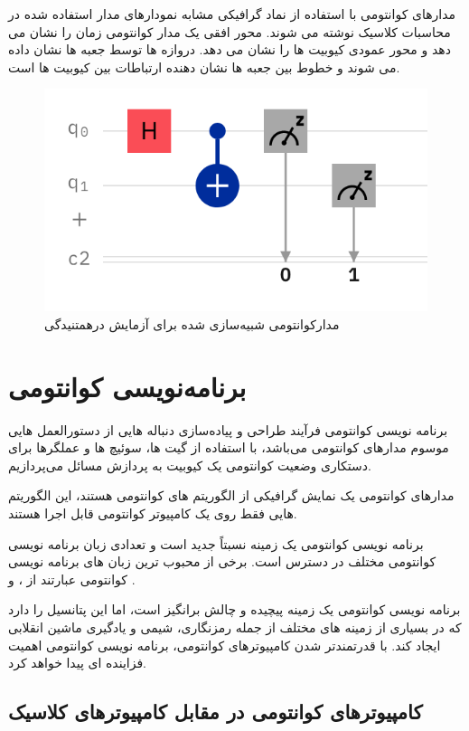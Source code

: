 \documentclass{book}
\begin{document}
مدارهای کوانتومی با استفاده از نماد گرافیکی مشابه نمودارهای مدار استفاده شده در محاسبات کلاسیک نوشته می شوند. محور افقی یک مدار کوانتومی زمان را نشان می دهد و محور عمودی کیوبیت ها را نشان می دهد. دروازه ها توسط جعبه ها نشان داده می شوند و خطوط بین جعبه ها نشان دهنده ارتباطات بین کیوبیت ها است.

\begin{figure}[ht]
	\centering
	\includegraphics[]{meas-firstcirc.png}
	\caption{مدارکوانتومی شبیه‌سازی شده برای آزمایش درهمتنیدگی}
\end{figure}

\chapter{برنامه‌نویسی کوانتومی}
برنامه نویسی کوانتومی فرآیند طراحی و پیاده‌سازی دنباله هایی از دستورالعمل هایی موسوم مدارهای کوانتومی می‌باشد، با استفاده از گیت ها، سوئیچ ها و عملگرها برای دستکاری وضعیت کوانتومی یک کیوبیت به پردازش مسائل می‌پردازیم.

مدارهای کوانتومی یک نمایش گرافیکی از الگوریتم های کوانتومی هستند، این الگوریتم هایی فقط روی یک کامپیوتر کوانتومی قابل اجرا هستند.

برنامه نویسی کوانتومی یک زمینه نسبتاً جدید است و تعدادی زبان برنامه نویسی کوانتومی مختلف در دسترس است. برخی از محبوب ترین زبان های برنامه نویسی کوانتومی عبارتند از ،  و .

برنامه نویسی کوانتومی یک زمینه پیچیده و چالش برانگیز است، اما این پتانسیل را دارد که در بسیاری از زمینه های مختلف از جمله رمزنگاری، شیمی و یادگیری ماشین انقلابی ایجاد کند. با قدرتمندتر شدن کامپیوترهای کوانتومی، برنامه نویسی کوانتومی اهمیت فزاینده ای پیدا خواهد کرد.
\section{کامپیوترهای کوانتومی در مقابل کامپیوترهای کلاسیک}
\end{document}
